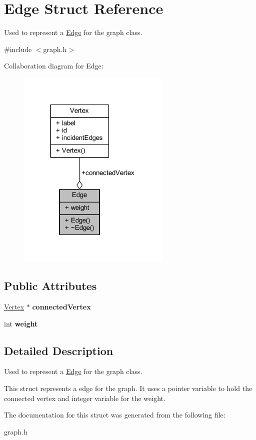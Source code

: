 \hypertarget{struct_edge}{}\section{Edge Struct Reference}
\label{struct_edge}


Used to represent a \hyperlink{struct_edge}{Edge} for the graph class.  




{\ttfamily \#include $<$graph.\+h$>$}



Collaboration diagram for Edge\+:
\nopagebreak
\begin{figure}[H]
\begin{center}
\leavevmode
\includegraphics[width=207pt]{struct_edge__coll__graph}
\end{center}
\end{figure}
\subsection*{Public Attributes}
\begin{DoxyCompactItemize}
\item 
\mbox{\label{struct_edge_a60f98913cc48bc254567cdb52d592e1c}} 
\hyperlink{struct_vertex}{Vertex} $\ast$ {\bfseries connected\+Vertex}
\item 
\mbox{\label{struct_edge_a4d58e1f4de38fa55549497175981ebab}} 
int {\bfseries weight}
\end{DoxyCompactItemize}


\subsection{Detailed Description}
Used to represent a \hyperlink{struct_edge}{Edge} for the graph class. 

This struct represents a edge for the graph. It uses a pointer variable to hold the connected vertex and integer variable for the weight. 

The documentation for this struct was generated from the following file\+:\begin{DoxyCompactItemize}
\item 
graph.\+h\end{DoxyCompactItemize}

